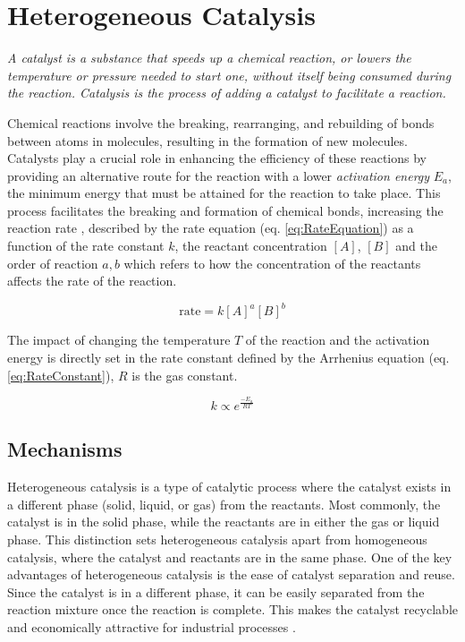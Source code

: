 \section{Heterogeneous Catalysis}\label{sec:Catalysis}

\textit{
A catalyst is a substance that speeds up a chemical reaction, or lowers the temperature or pressure needed to start one, without itself being consumed during the reaction.
Catalysis is the process of adding a catalyst to facilitate a reaction.
}

Chemical reactions involve the breaking, rearranging, and rebuilding of bonds between atoms in molecules, resulting in the formation of new molecules.
Catalysts play a crucial role in enhancing the efficiency of these reactions by providing an alternative route for the reaction with a lower \textit{activation energy} $E_a$, the minimum energy that must be attained for the reaction to take place.
This process facilitates the breaking and formation of chemical bonds, increasing the reaction rate \parencite{Schlogl2015, Hagen2016}, described by the rate equation (eq. \ref{eq:RateEquation}) as a function of the rate constant $k$, the reactant concentration $[A]$, $[B]$ and the order of reaction $a, b$ which refers to how the concentration of the reactants affects the rate of the reaction.

\begin{equation}
    \label{eq:RateEquation}
    \text{rate} = k [A]^a [B]^b
\end{equation}

The impact of changing the temperature $T$ of the reaction and the activation energy is directly set in the rate constant defined by the Arrhenius equation (eq. \ref{eq:RateConstant}), $R$ is the gas constant.

\begin{equation}
    \label{eq:RateConstant}
    k \propto e^{\frac{-E_a}{RT}}
\end{equation}

\subsection{Mechanisms}

Heterogeneous catalysis is a type of catalytic process where the catalyst exists in a different phase (solid, liquid, or gas) from the reactants.
Most commonly, the catalyst is in the solid phase, while the reactants are in either the gas or liquid phase.
This distinction sets heterogeneous catalysis apart from homogeneous catalysis, where the catalyst and reactants are in the same phase.
One of the key advantages of heterogeneous catalysis is the ease of catalyst separation and reuse.
Since the catalyst is in a different phase, it can be easily separated from the reaction mixture once the reaction is complete.
This makes the catalyst recyclable and economically attractive for industrial processes \parencite{FECHETE20122}.

